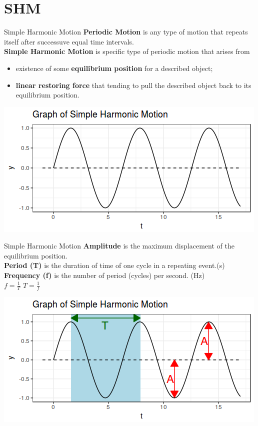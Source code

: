 \section{SHM}
\begin{frame}{Simple Harmonic Motion}
\textbf{Periodic Motion} is any type of motion that repeats itself after successuve equal time intervals. \medskip\\
\textbf{Simple Harmonic Motion} is specific type of periodic motion that arises from
\begin{itemize}
\item existence of some \textbf{equilibrium position} for a described object;
\item \textbf{linear restoring force} that tending to pull the described object back to its equilibrium position.
\end{itemize}
\vfill
\begin{center}
\includegraphics[width=0.7\linewidth]{04-SHM.png}
\end{center}
\end{frame}
\begin{frame}{Simple Harmonic Motion}
\textbf{Amplitude} is the maximum displacement of the equilibrium position.\medskip\\
\textbf{Period (T)} is the duration of time of one cycle in a repeating event.\hfill (s)\medskip\\
\textbf{Frequency (f)} is the number of period (cycles) per second. \hfill (Hz)\bigskip\\
\hfill $ f = \frac{1}{T}$ \hfill $T = \frac{1}{f} $\hfill ${}$\\
\vfill
\begin{center}
\includegraphics[width=0.7\linewidth]{05-SHM-annotated.png}
\end{center}
\nocite{berg05}
\end{frame}

